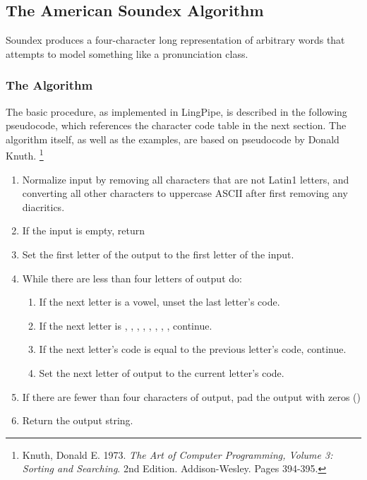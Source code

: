 \subsection{The American Soundex Algorithm}

Soundex produces a four-character long representation of arbitrary
words that attempts to model something like a pronunciation class.


\subsubsection{The Algorithm}

The basic procedure, as implemented in LingPipe, is described
in the following pseudocode, which references the character code
table in the next section.  The algorithm itself, as well as the
examples, are based on pseudocode by Donald Knuth.%
%
\footnote{Knuth, Donald E. 1973. {\it The Art of Computer Programming, Volume 3:
 Sorting and Searching}. 2nd Edition.  Addison-Wesley. Pages 394-395.}
%
\begin{enumerate}
\item
Normalize input by removing all characters that are not Latin1
letters, and converting all other characters to uppercase ASCII after
first removing any diacritics.
\item 
If the input is empty, return 
\item 
Set the first letter of the output to the first letter of the input.
\item 
While there are less than four letters of output do:
%
\begin{enumerate}
  \item If the next letter is a vowel, unset the last letter's code.
  \item If the next letter is , , 
     , , , , 
     , , continue.
  \item If the next letter's code is equal to the previous letter's code, continue.
  \item Set the next letter of output to the current letter's code. 
\end{enumerate}
\item 
If there are fewer than four characters of output, pad the output with zeros ()
\item 
Return the output string. 
\end{enumerate}

